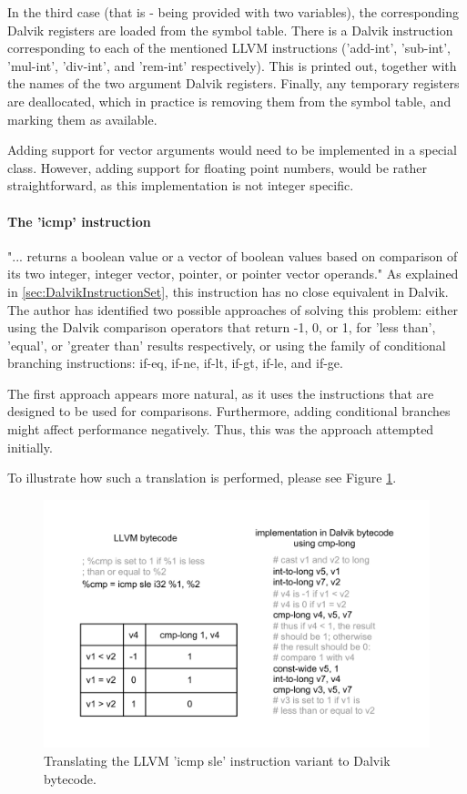 \documentclass[parskip]{cs4rep}
\begin{document}
In the third case (that is - being provided with two variables), the corresponding Dalvik registers are loaded from the symbol table. There is a Dalvik instruction corresponding to each of the mentioned LLVM instructions ('add-int', 'sub-int', 'mul-int', 'div-int', and 'rem-int' respectively). This is printed out, together with the names of the two argument Dalvik registers. Finally, any temporary registers are deallocated, which in practice is removing them from the symbol table, and marking them as available.

Adding support for vector arguments would need to be implemented in a special class. However, adding support for floating point numbers, would be rather straightforward, as this implementation is not integer specific.

\paragraph{The 'icmp' instruction} "... returns a boolean value or a vector of boolean values based on comparison of its two integer, integer vector, pointer, or pointer vector operands."\cite{P11} As explained in \ref{sec:DalvikInstructionSet}, this instruction has no close equivalent in Dalvik. The author has identified two possible approaches of solving this problem: either using the Dalvik comparison operators that return -1, 0, or 1, for 'less than', 'equal', or 'greater than' results respectively, or using the family of conditional branching instructions: if-eq, if-ne, if-lt, if-gt, if-le, and if-ge.

The first approach appears more natural, as it uses the instructions that are designed to be used for comparisons. Furthermore, adding conditional branches might affect performance negatively. Thus, this was the approach attempted initially.

To illustrate how such a translation is performed, please see Figure \ref{fig:cmpsle}.

\begin{figure}[h!]
    \centering
        \includegraphics[width=1.0\textwidth]{cmpsle}
    \caption{Translating the LLVM 'icmp sle' instruction variant to Dalvik bytecode.}
    \label{fig:cmpsle}
\end{figure}
\end{document}
